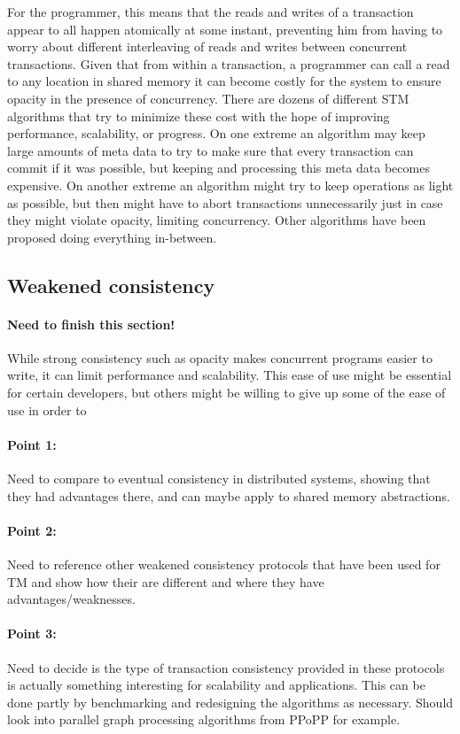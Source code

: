 \documentclass[11pt,letterpaper]{article}
\begin{document}
For the programmer, this means that the reads and writes of a transaction
appear to all happen atomically at some instant, preventing him from having
to worry about different interleaving of reads and writes between concurrent transactions.
Given that from within a transaction, a programmer can call a read to any location in shared memory
it can become costly for the system to ensure opacity in the presence of concurrency.
There are dozens of different STM algorithms that try to minimize these cost with the hope
of improving performance, scalability, or progress.
On one extreme an algorithm may keep large amounts of meta data to try to make
sure that every transaction can commit if it was possible, but keeping and processing
this meta data becomes expensive.
On another extreme an algorithm might try to keep operations as light as possible, but
then might have to abort transactions unnecessarily just in case they might violate
opacity, limiting concurrency.
Other algorithms have been proposed doing everything in-between.


\subsection{Weakened consistency}
\paragraph{Need to finish this section!}
While strong consistency such as opacity makes concurrent programs easier to write,
it can limit performance and scalability.
This ease of use might be essential for certain developers, but others might be willing
to give up some of the ease of use in order to 

\paragraph{Point 1:} Need to compare to eventual consistency in distributed systems, showing
that they had advantages there, and can maybe apply to shared memory abstractions.

\paragraph{Point 2:} Need to reference other weakened consistency protocols that have been used
for TM and show how their are different and where they have advantages/weaknesses.

\paragraph{Point 3:} Need to decide is the type of transaction consistency provided in these
protocols is actually something interesting for scalability and applications.
This can be done partly by benchmarking and redesigning the algorithms as necessary.
Should look into parallel graph processing algorithms from PPoPP for example.
\end{document}
